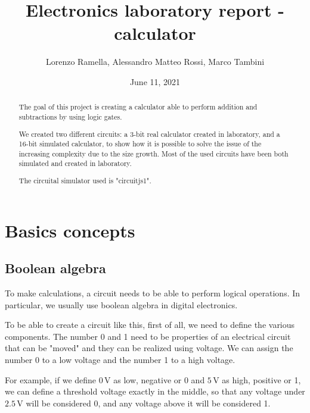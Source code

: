 \documentclass{article}
\title{Electronics laboratory report - calculator}
\author{Lorenzo Ramella, Alessandro Matteo Rossi, Marco Tambini}
\date{June 11, 2021}
\begin{document}
\maketitle

\begin{abstract}
  The goal of this project is creating a calculator able to perform addition and subtractions by using logic gates.

\vspace{3mm}

  We created two different circuits: a 3-bit real calculator created in laboratory, and a 16-bit simulated calculator, to show how it is possible to solve the issue of the increasing complexity due to the size growth. Most of the used circuits have been both simulated and created in laboratory.

\vspace{3mm}

  The circuital simulator used is "circuitjs1". %
\end{abstract}
\clearpage
\tableofcontents

\clearpage

\section{Basics concepts}

\subsection{Boolean algebra}
To make calculations, a circuit needs to be able to perform logical operations. In particular, we usually use boolean algebra in digital electronics. 

\vspace{3mm}

To be able to create a circuit like this, first of all, we need to define the various components.
The number 0 and 1 need to be properties of an electrical circuit that can be "moved" and they can be realized using voltage. We can assign the number 0 to a low voltage and the number 1 to a high voltage. 

\vspace{3mm}

For example, if we define $0\,\textrm{V}$ as low, negative or 0 and $5\,\textrm{V}$ as high, positive or 1, we can define a threshold voltage exactly in the middle, so that any voltage under $2.5\,\textrm{V}$ will be considered 0, and any voltage above it will be considered 1.
\end{document}
